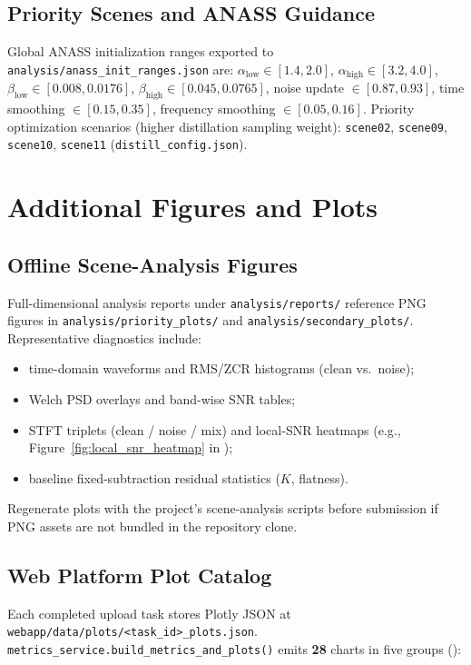 \section{Priority Scenes and ANASS Guidance}
\label{app:anass}

Global ANASS initialization ranges exported to \texttt{analysis/anass\_init\_ranges.json} are:
$\alpha_{\mathrm{low}}\in[1.4,2.0]$, $\alpha_{\mathrm{high}}\in[3.2,4.0]$,
$\beta_{\mathrm{low}}\in[0.008,0.0176]$, $\beta_{\mathrm{high}}\in[0.045,0.0765]$,
noise update $\in[0.87,0.93]$, time smoothing $\in[0.15,0.35]$, frequency smoothing $\in[0.05,0.16]$.
Priority optimization scenarios (higher distillation sampling weight): \texttt{scene02}, \texttt{scene09}, \texttt{scene10}, \texttt{scene11} (\texttt{distill\_config.json}).

\chapter{Additional Figures and Plots}
\label{app:figures}

\section{Offline Scene-Analysis Figures}

Full-dimensional analysis reports under \texttt{analysis/reports/} reference PNG figures in \texttt{analysis/priority\_plots/} and \texttt{analysis/secondary\_plots/}. Representative diagnostics include:
\begin{itemize}
  \item time-domain waveforms and RMS/ZCR histograms (clean vs.\ noise);
  \item Welch PSD overlays and band-wise SNR tables;
  \item STFT triplets (clean / noise / mix) and local-SNR heatmaps (e.g., Figure~\ref{fig:local_snr_heatmap} in );
  \item baseline fixed-subtraction residual statistics ($K$, flatness).
\end{itemize}
Regenerate plots with the project's scene-analysis scripts before submission if PNG assets are not bundled in the repository clone.

\section{Web Platform Plot Catalog}

Each completed upload task stores Plotly JSON at \texttt{webapp/data/plots/<task\_id>\_plots.json}. \texttt{metrics\_service.build\_metrics\_and\_plots()} emits \textbf{28} charts in five groups ():

